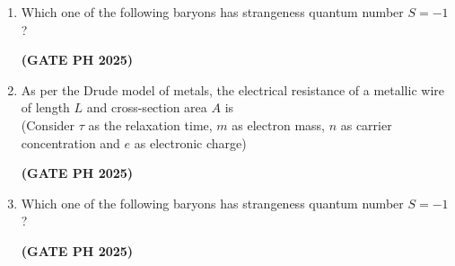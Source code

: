 \documentclass[14pt, a4paper]{extarticle}
\begin{document}
\begin{enumerate}[label=\textbf{Q.\arabic*}]
\item Which one of the following baryons has strangeness quantum number $S = -1$?
\begin{enumerate}
\end{enumerate}
\hfill \textbf{(GATE PH 2025)}

\item As per the Drude model of metals, the electrical resistance of a metallic wire of length $L$ and cross-section area $A$ is \\
(Consider $\tau$ as the relaxation time, $m$ as electron mass, $n$ as carrier concentration and $e$ as electronic charge)
\begin{enumerate}
\end{enumerate}
\hfill \textbf{(GATE PH 2025)}

\item Which one of the following baryons has strangeness quantum number $S = -1$?
\begin{enumerate}
\end{enumerate}
\hfill \textbf{(GATE PH 2025)}


\end{enumerate}
\end{document}
